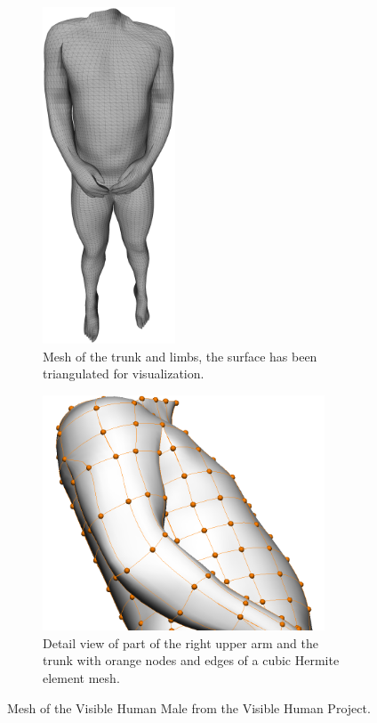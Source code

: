 \begin{figure}%
  \centering%
  \begin{subfigure}[t]{0.48\textwidth}%
    \centering%
    \includegraphics[height=10cm]{images/fiber_creation/skin00.png}%
    \caption{Mesh of the trunk and limbs, the surface has been triangulated for visualization.}%
    \label{fig:vhp_total}%
  \end{subfigure}
  \quad
  \begin{subfigure}[t]{0.48\textwidth}%
    \centering%
    \includegraphics[height=7cm]{images/fiber_creation/elements4_red.png}%
    \caption{Detail view of part of the right upper arm and the trunk with orange nodes and edges of a cubic Hermite element mesh.}%
    \label{fig:vhp_detail}%
  \end{subfigure} 
  \caption{Mesh of the Visible Human Male from the Visible Human Project.}%
  \label{fig:vhp_geometry}%
\end{figure}%

